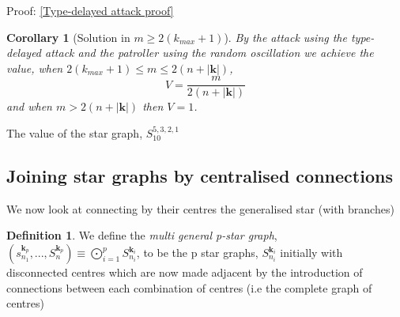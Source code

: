\documentclass[a4paper,10pt]{article}
\newtheorem{corollary}[theorem]{Corollary}
\theoremstyle{definition}
\newtheorem{definition}[theorem]{Definition}
\theoremstyle{definition}
\theoremstyle{remark}
\theoremstyle{definition}
\begin{document}
Proof: \ref{Type-delayed attack proof}


\begin{corollary}[Solution in $m \geq 2(k_{max}+1)$]
By the attack using the type-delayed attack and the patroller using the random oscillation we achieve the value, when $2(k_{max}+1) \leq m \leq 2(n+|\bm{k}|)$,
$$V= \frac{m}{2(n+|\bm{k}|)} $$
and when $m > 2(n+|\bm{k}|)$ then $V=1$.
\end{corollary}

\begin{myfigure}
\resizebox{0.95\linewidth}{!}{

}
\caption{The value of the star graph, $S_{10}^{5,3,2,1}$}
\end{myfigure}

\subsection{Joining star graphs by centralised connections}

We now look at connecting by their centres the generalised star (with branches)

\begin{definition}
We define the \textit{multi general p-star graph}, $(s_{n_{1}}^{\bm{k}_{p}},...,S_{n_{}}^{\bm{k}_{p}}) \equiv \bigodot\limits_{i=1}^{p} S_{n_{i}}^{\bm{k}_{i}}$, to be the p star graphs, $S_{n_{i}}^{\bm{k}_{i}}$ initially with disconnected centres which are now made adjacent by the introduction of connections between each combination of centres (i.e the complete graph of centres)
\end{definition}
\end{document}
